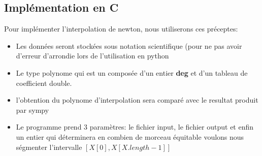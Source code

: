 \documentclass{report}
\begin{document}
\subsection{Implémentation en C}
Pour implémenter l'interpolation de newton, nous utiliserons ces préceptes:
\begin{itemize}
\item Les données seront stockées sous notation scientifique (pour ne pas avoir d'erreur d'arrondie lors de l'utilisation en python
\item Le type polynome qui est un composée d'un entier \textbf{deg} et d'un tableau de coefficient double.
\item l'obtention du polynome d'interpolation sera comparé avec le resultat produit par sympy
\item Le programme prend 3 paramètres: le fichier input, le fichier output et enfin un entier qui déterminera en combien de morceau équitable voulons nous ségmenter l'intervalle $[X[0], X[X.length-1]]$ 
\end{itemize}
\newpage
\end{document}
